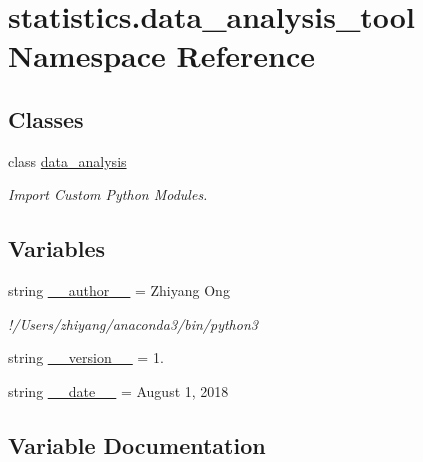 \hypertarget{namespacestatistics_1_1data__analysis__tool}{}\section{statistics.\+data\+\_\+analysis\+\_\+tool Namespace Reference}
\label{namespacestatistics_1_1data__analysis__tool}
\subsection*{Classes}
\begin{DoxyCompactItemize}
\item 
class \hyperlink{classstatistics_1_1data__analysis__tool_1_1data__analysis}{data\+\_\+analysis}
\begin{DoxyCompactList}\small\item\em Import Custom Python Modules. \end{DoxyCompactList}\end{DoxyCompactItemize}
\subsection*{Variables}
\begin{DoxyCompactItemize}
\item 
string \hyperlink{namespacestatistics_1_1data__analysis__tool_a0d015dff70798eb64719348296063f84}{\+\_\+\+\_\+author\+\_\+\+\_\+} = \textquotesingle{}Zhiyang Ong\textquotesingle{}
\begin{DoxyCompactList}\small\item\em !/\+Users/zhiyang/anaconda3/bin/python3 \end{DoxyCompactList}\item 
string \hyperlink{namespacestatistics_1_1data__analysis__tool_ada80d84be4de19ef8e1df3bf71640e46}{\+\_\+\+\_\+version\+\_\+\+\_\+} = \textquotesingle{}1.\textquotesingle{}
\item 
string \hyperlink{namespacestatistics_1_1data__analysis__tool_a59cd367b85d035e0be0b931b6c346ec8}{\+\_\+\+\_\+date\+\_\+\+\_\+} = \textquotesingle{}August 1, 2018\textquotesingle{}
\end{DoxyCompactItemize}


\subsection{Variable Documentation}
\hypertarget{namespacestatistics_1_1data__analysis__tool_a0d015dff70798eb64719348296063f84}{}
